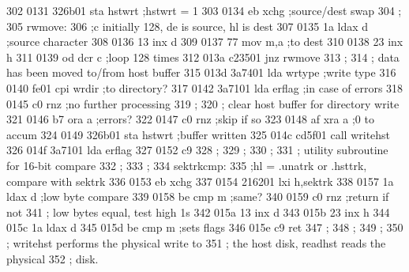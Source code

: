 302    0131 326b01           sta      hstwrt                 ;hstwrt = 1
303    0134 eb               xchg                            ;source/dest swap
304                ;
305                rwmove:
306                          ;c initially 128, de is source, hl is dest
307    0135 1a               ldax     d                      ;source character
308    0136 13               inx      d            
309    0137 77               mov      m,a                    ;to dest
310    0138 23               inx      h
311    0139 od               dcr      c                      ;loop 128 times
312    013a c23501           jnz      rwmove
313                ;
314                ;         data has been moved to/from host buffer
315    013d 3a7401           lda      wrtype                 ;write type
316    0140 fe01             cpi      wrdir                  ;to directory?
317    0142 3a7101           lda      erflag                 ;in case of errors
318    0145 c0               rnz                             ;no further processing
319                ;
320                ;         clear host buffer for directory write
321    0146 b7               ora      a                      ;errors?
322    0147 c0               rnz                             ;skip if so
323    0148 af               xra      a                      ;0 to accum
324    0149 326b01           sta      hstwrt                 ;buffer written
325    014c cd5f01           call     writehst
326    014f 3a7101           lda      erflag
327    0152 c9
328                ;
329                ;
330                ;
331                ;         utility subroutine for 16-bit compare
332                ;
333                ;
334                sektrkcmp:
335                          ;hl = .unatrk or .hsttrk, compare with sektrk
336    0153 eb               xchg
337    0154 216201           lxi      h,sektrk
338    0157 1a               ldax     d                      ;low byte compare
339    0158 be               cmp      m                      ;same?
340    0159 c0               rnz                             ;return if not
341                ;         low bytes equal, test high 1s
342    015a 13               inx      d
343    015b 23               inx      h
344    015c 1a               ldax     d
345    015d be               cmp      m                  ;sets flags
346    015e c9               ret
347                ;
348                ;
349                ;
350                ;         writehst performs the physical write to
351                ;         the host disk, readhst reads the physical
352                ;         disk.
